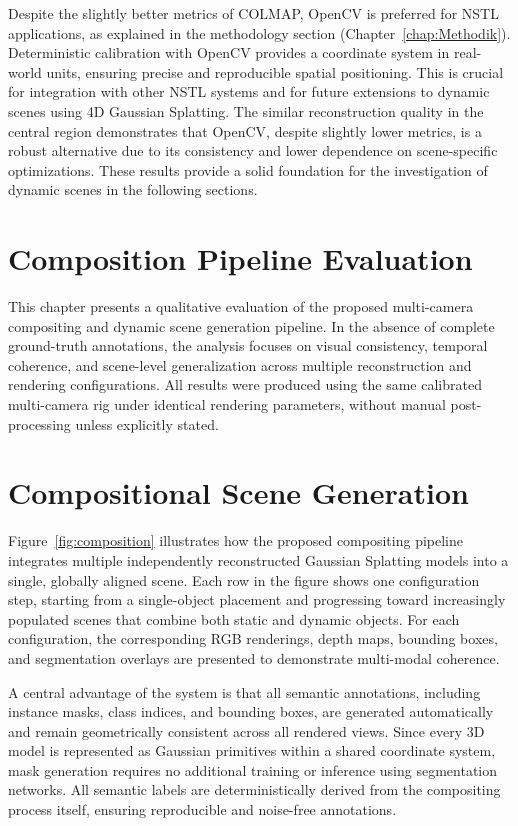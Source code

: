 Despite the slightly better metrics of COLMAP, OpenCV is preferred for NSTL applications, as explained in the methodology section (Chapter~\ref{chap:Methodik}). 
Deterministic calibration with OpenCV provides a coordinate system in real-world units, ensuring precise and reproducible spatial positioning. 
This is crucial for integration with other NSTL systems and for future extensions to dynamic scenes using 4D Gaussian Splatting. 
The similar reconstruction quality in the central region demonstrates that OpenCV, despite slightly lower metrics, is a robust alternative due to its consistency and lower dependence on scene-specific optimizations. 
These results provide a solid foundation for the investigation of dynamic scenes in the following sections.




\section{Composition Pipeline Evaluation}

This chapter presents a qualitative evaluation of the proposed multi-camera compositing and dynamic scene generation pipeline. 
In the absence of complete ground-truth annotations, the analysis focuses on visual consistency, temporal coherence, and scene-level generalization across multiple reconstruction and rendering configurations. 
All results were produced using the same calibrated multi-camera rig under identical rendering parameters, without manual post-processing unless explicitly stated.

\section{Compositional Scene Generation}
Figure~\ref{fig:composition} illustrates how the proposed compositing pipeline integrates multiple independently reconstructed Gaussian Splatting models into a single, globally aligned scene. 
Each row in the figure shows one configuration step, starting from a single-object placement and progressing toward increasingly populated scenes that combine both static and dynamic objects.
For each configuration, the corresponding RGB renderings, depth maps, bounding boxes, and segmentation overlays are presented to demonstrate multi-modal coherence.

A central advantage of the system is that all semantic annotations, including instance masks, class indices, and bounding boxes, are generated automatically and remain geometrically consistent across all rendered views. 
Since every 3D model is represented as Gaussian primitives within a shared coordinate system, mask generation requires no additional training or inference using segmentation networks. 
All semantic labels are deterministically derived from the compositing process itself, ensuring reproducible and noise-free annotations.

